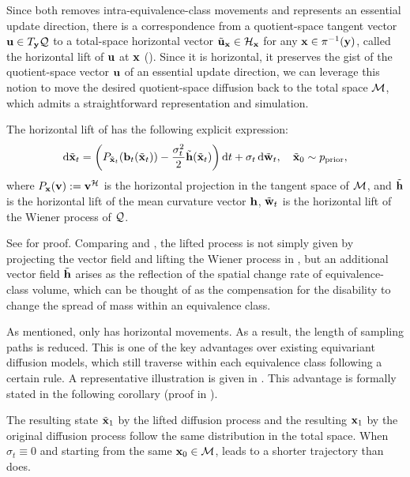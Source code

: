 \documentclass{article} %
\newcommand{\prior}{\mathrm{prior}}
\newcommand{\bfxxt}{\tilde{\bfxx}}
\newcommand{\bfhht}{\tilde{\bfhh}}
\newcommand{\bfuut}{\tilde{\bfuu}}
\newcommand{\bfwwt}{\tilde{\bfww}}
\begin{document}
Since both removes intra-equivalence-class movements and represents an essential update direction, there is a correspondence from a quotient-space tangent vector $\mathbf{u} \in T_{\mathbf{y}} \mathcal{Q}$ to a total-space horizontal vector $\bfuut_\bfxx \in \clH_\bfxx$ for any $\mathbf{x} \in \pi^{-1}(\mathbf{y})$, called the horizontal lift of $\mathbf{u}$ at $\mathbf{x}$ ().
Since it is horizontal, it preserves the gist of the quotient-space vector $\mathbf{u}$ of an essential update direction, we can leverage this notion to move the desired quotient-space diffusion  back to the total space $\mathcal{M}$, which admits a straightforward representation and simulation.

\begin{theorem}\label{thm:horizontal-lifted-sde}
    The horizontal lift of  has the following explicit expression:
    \begin{align}\label{eqn:lifted-sde}
        \dd\bfxxt_t=\left(P_{\bfxxt_t}(\bfbb_t(\bfxxt_t))-\frac{\sigma_t^2}{2}\bfhht(\bfxxt_t)\right)\dd t + \sigma_t \ud \bfwwt_t,
        \quad \bfxxt_0\sim p_\prior,
    \end{align}
    where $P_{\mathbf{x}}(\mathbf{v}) := \mathbf{v}^{\mathcal{H}}$ is the horizontal projection in the tangent space of $\mathcal{M}$, and $\bfhht$ is the horizontal lift of the mean curvature vector $\mathbf{h}$, $\bfwwt_t$ is the horizontal lift of the Wiener process of $\mathcal{Q}$.  
    \vspace{-2pt}
\end{theorem}

See  for proof.
Comparing  and , the lifted process is not simply given by projecting the vector field and lifting the Wiener process in , but an additional vector field $\bfhht$ arises as the reflection of the spatial change rate of equivalence-class volume, which can be thought of as the compensation for the disability to change the spread of mass within an equivalence class. 

As mentioned,  only has horizontal movements. 
As a result, the length of sampling paths is reduced. This is one of the key advantages over existing equivariant diffusion models, which still traverse within each equivalence class following a certain rule. 
A representative illustration is given in .
This advantage is formally stated in the following corollary (proof in ).
\begin{corollary}\label{cor:length}
    The resulting state $\bfxxt_1$ by the lifted diffusion process  and the resulting $\mathbf{x}_1$ by the original diffusion process  follow the same distribution in the total space. 
    When $\sigma_t \equiv 0$ and starting from the same $\mathbf{x}_0 \in \mathcal{M}$,  leads to a shorter trajectory than  does.
\end{corollary}
\end{document}
